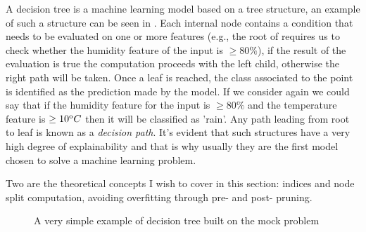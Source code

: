 \smallskip

A decision tree is a machine learning model based on a tree structure, an example of such a
structure can be seen in . Each internal node contains a condition that needs to
be evaluated on one or more features (e.g.,  the root of  requires us to check
whether the humidity feature of the input is $\geq 80\%$), if the result of the evaluation is true
the computation proceeds with the left child, otherwise the right path will be taken. Once a leaf is
reached, the class associated to the point is identified as the prediction made by the model. If we consider again  we could say that if the humidity feature for the input is $\geq 80\%$ and the temperature feature is $\geq 10^\text{o}C$ then it will be classified as 'rain'. Any path leading from root to leaf is known as a \emph{decision path}. It's evident that such structures have a very high degree of explainability and that is why usually they are the first model chosen to solve a machine learning problem.

\medskip

Two are the theoretical concepts I wish to cover in this section: indices and node split
computation, avoiding overfitting through pre- and post- pruning.
\begin{figure}
	\centering
	\caption{A very simple example of decision tree built on the mock problem}
	\label{fig:simple-dt}
\end{figure}
